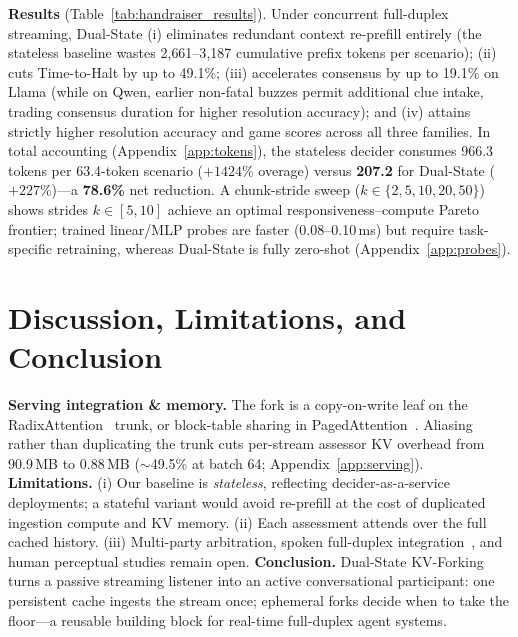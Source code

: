 \documentclass{article}
\begin{document}
\textbf{Results} (Table~\ref{tab:handraiser_results}). Under concurrent full-duplex streaming, Dual-State (i) eliminates redundant context re-prefill entirely (the stateless baseline wastes 2{,}661--3{,}187 cumulative prefix tokens per scenario); (ii) cuts Time-to-Halt by up to 49.1\%; (iii) accelerates consensus by up to 19.1\% on Llama (while on Qwen, earlier non-fatal buzzes permit additional clue intake, trading consensus duration for higher resolution accuracy); and (iv) attains strictly higher resolution accuracy and game scores across all three families. In total accounting (Appendix~\ref{app:tokens}), the stateless decider consumes 966.3 tokens per 63.4-token scenario ($+1424\%$ overage) versus \textbf{207.2} for Dual-State ($+227\%$)---a \textbf{78.6\%} net reduction. A chunk-stride sweep ($k \in \{2, 5, 10, 20, 50\}$) shows strides $k \in [5, 10]$ achieve an optimal responsiveness--compute Pareto frontier; trained linear/MLP probes are faster (0.08--0.10\,ms) but require task-specific retraining, whereas Dual-State is fully zero-shot (Appendix~\ref{app:probes}).

\section{Discussion, Limitations, and Conclusion}
\label{sec:discussion}

\textbf{Serving integration \& memory.} The fork is a copy-on-write leaf on the RadixAttention~\citep{zheng2023sglang} trunk, or block-table sharing in PagedAttention~\citep{kwon2023vllm}. Aliasing rather than duplicating the trunk cuts per-stream assessor KV overhead from 90.9\,MB to 0.88\,MB ($\sim$49.5\% at batch 64; Appendix~\ref{app:serving}).
\textbf{Limitations.} (i) Our baseline is \emph{stateless}, reflecting decider-as-a-service deployments; a stateful variant would avoid re-prefill at the cost of duplicated ingestion compute and KV memory. (ii) Each assessment attends over the full cached history. (iii) Multi-party arbitration, spoken full-duplex integration~\citep{defossez2024moshi}, and human perceptual studies remain open.
\textbf{Conclusion.} Dual-State KV-Forking turns a passive streaming listener into an active conversational participant: one persistent cache ingests the stream once; ephemeral forks decide when to take the floor---a reusable building block for real-time full-duplex agent systems.
\end{document}
